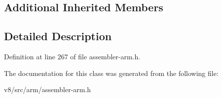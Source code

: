 \subsection*{Additional Inherited Members}


\subsection{Detailed Description}


Definition at line 267 of file assembler-\/arm.\+h.



The documentation for this class was generated from the following file\+:\begin{DoxyCompactItemize}
\item 
v8/src/arm/assembler-\/arm.\+h\end{DoxyCompactItemize}
